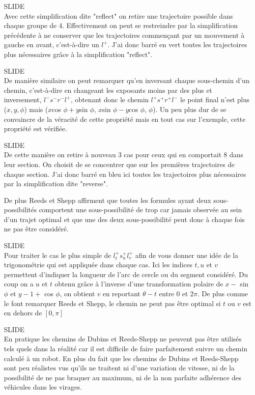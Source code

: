 \documentclass[12pt,a4paper]{article}
\newcommand{\slide}{\vspace{0.6cm}SLIDE\\}
\begin{document}
	\slide
	
	Avec cette simplification dite "reflect" on retire une trajectoire possible dans chaque groupe de 4. Effectivement on peut se restreindre par la simplification précédente à ne conserver que les trajectoires commençant par un mouvement à gauche en avant, c'est-à-dire un $l^+$. J'ai donc barré en vert toutes les trajectoires plus nécessaires grâce à la simplification "reflect".
	
	\slide
	
	De manière similaire on peut remarquer qu'en inversant chaque sous-chemin d'un chemin, c'est-à-dire en changeant les exposants moins par des plus et inversement, $l^-s^-r^-l^+$, obtenant donc le chemin $l^+s^+r^+l^-$ le point final n'est plus ($x, y, \phi$) mais ($x$cos $\phi+y$sin $\phi$, $x$sin $\phi-y$cos $\phi$, $\phi$). Un peu plus dur de se convaincre de la véracité de cette propriété mais en tout cas sur l'exemple, cette propriété est vérifiée.
	
	\slide
	
	De cette manière on retire à nouveau 3 cas pour ceux qui en comportait 8 dans leur section. On choisit de se concentrer que sur les premières trajectoires de chaque section. J'ai donc barré en bleu ici toutes les trajectoires plus nécessaires par la simplification dite "reverse".
	
	
	De plus Reeds et Shepp affirment que toutes les formules ayant deux sous-possibilités comportent une sous-possibilité de trop car jamais observée au sein d'un trajet optimal et que une des deux sous-possibilité peut donc à chaque fois ne pas être considéré.
	
	\slide
	
	Pour traiter le cas le plus simple de $l_t^+s_u^+l_v^+$ afin de vous donner une idée de la trigonométrie qui est appliquée dans chaque cas. Ici les indices $t, u$ et $v$ permettent d'indiquer la longueur de l'arc de cercle ou du segment considéré. Du coup on a $u$ et $t$ obtenu grâce à l'inverse d'une transformation polaire de $x -$ sin $\phi$ et $y - 1 +$ cos $\phi$, on obtient $v$ en reportant $\theta - t$ entre 0 et $2\pi$. De plus comme le font remarquer Reeds et Shepp, le chemin ne peut pas être optimal si $t$ ou $v$ est en dehors de $[0, \pi]$
	
	\slide
	
	En pratique les chemins de Dubins et Reeds-Shepp ne peuvent pas être utilisés tels quels dans la réalité car il est difficile de faire parfaitement suivre un chemin calculé à un robot. En plus du fait que les chemins de Dubins et Reeds-Shepp sont peu réalistes vus qu'ils ne traitent ni d'une variation de vitesse, ni de la possibilité de ne pas braquer au maximum, ni de la non parfaite adhérence des véhicules dans les virages.
	
\end{document}
